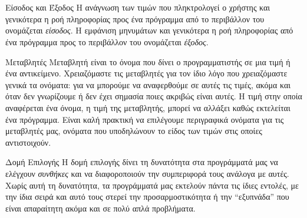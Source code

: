 \documentclass[a4paper,11pt,oneside]{book}
\begin{document}
\section*{}
\vspace{-\parskip}
\hrulefill

\begin{theory}{Είσοδος και Έξοδος}
Η ανάγνωση των τιμών που πληκτρολογεί ο χρήστης και γενικότερα η ροή πληροφορίας προς ένα πρόγραμμα από το περιβάλλον του ονομάζεται \emph{είσοδος}.
Η εμφάνιση μηνυμάτων και γενικότερα η ροή πληροφορίας από ένα πρόγραμμα προς το περιβάλλον του ονομάζεται \emph{έξοδος}.
\end{theory}

\begin{theory}{Μεταβλητές}
Μεταβλητή είναι το όνομα που δίνει ο προγραμματιστής σε μια τιμή ή ένα αντικείμενο. Χρειαζόμαστε τις μεταβλητές για τον ίδιο λόγο που χρειαζόμαστε γενικά τα ονόματα: για να μπορούμε να αναφερθούμε σε αυτές τις τιμές, ακόμα και όταν δεν γνωρίζουμε ή δεν έχει σημασία ποιες ακριβώς είναι αυτές.
Η τιμή στην οποία αναφέρεται ένα όνομα, η τιμή της μεταβλητής, μπορεί να αλλάξει καθώς εκτελείται ένα πρόγραμμα. Είναι καλή πρακτική να επιλέγουμε περιγραφικά ονόματα για τις μεταβλητές μας, ονόματα που υποδηλώνουν το είδος των τιμών στις οποίες αντιστοιχούν. 
\end{theory}

\begin{theory}{Δομή Επιλογής}
Η δομή επιλογής δίνει τη δυνατότητα στα προγράμματά μας να ελέγχουν \emph{συνθήκες} και να διαφοροποιούν την συμπεριφορά τους ανάλογα με αυτές. Χωρίς αυτή τη δυνατότητα, τα προγράμματά μας εκτελούν πάντα τις ίδιες εντολές, με την ίδια σειρά και αυτό τους στερεί την προσαρμοστικότητα ή την ``εξυπνάδα'' που είναι απαραίτητη ακόμα και σε πολύ απλά προβλήματα.
\end{theory}
\end{document}

